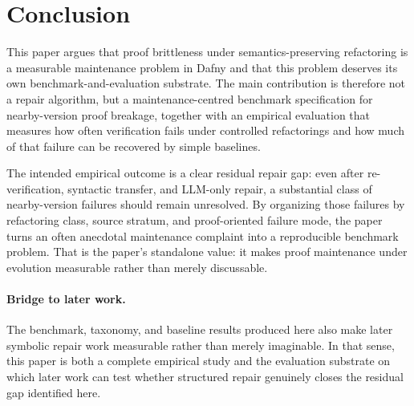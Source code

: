 \section{Conclusion}

This paper argues that proof brittleness under semantics-preserving refactoring is a measurable maintenance problem in Dafny and that this problem deserves its own benchmark-and-evaluation substrate. The main contribution is therefore not a repair algorithm, but a maintenance-centred benchmark specification for nearby-version proof breakage, together with an empirical evaluation that measures how often verification fails under controlled refactorings and how much of that failure can be recovered by simple baselines.

The intended empirical outcome is a clear residual repair gap: even after re-verification, syntactic transfer, and LLM-only repair, a substantial class of nearby-version failures should remain unresolved. By organizing those failures by refactoring class, source stratum, and proof-oriented failure mode, the paper turns an often anecdotal maintenance complaint into a reproducible benchmark problem. That is the paper's standalone value: it makes proof maintenance under evolution measurable rather than merely discussable.

\paragraph{Bridge to later work.}
The benchmark, taxonomy, and baseline results produced here also make later symbolic repair work measurable rather than merely imaginable. In that sense, this paper is both a complete empirical study and the evaluation substrate on which later work can test whether structured repair genuinely closes the residual gap identified here.
